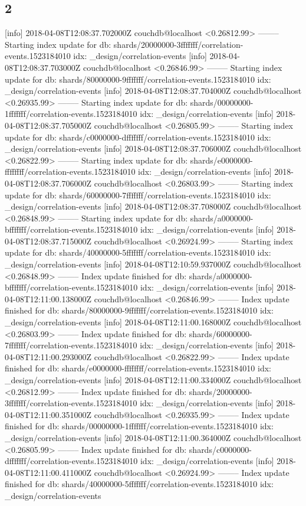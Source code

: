 \subsection{2}
[info] 2018-04-08T12:08:37.702000Z couchdb@localhost <0.26812.99> -------- Starting index update for db: shards/20000000-3fffffff/correlation-events.1523184010 idx: _design/correlation-events
[info] 2018-04-08T12:08:37.703000Z couchdb@localhost <0.26846.99> -------- Starting index update for db: shards/80000000-9fffffff/correlation-events.1523184010 idx: _design/correlation-events
[info] 2018-04-08T12:08:37.704000Z couchdb@localhost <0.26935.99> -------- Starting index update for db: shards/00000000-1fffffff/correlation-events.1523184010 idx: _design/correlation-events
[info] 2018-04-08T12:08:37.705000Z couchdb@localhost <0.26805.99> -------- Starting index update for db: shards/c0000000-dfffffff/correlation-events.1523184010 idx: _design/correlation-events
[info] 2018-04-08T12:08:37.706000Z couchdb@localhost <0.26822.99> -------- Starting index update for db: shards/e0000000-ffffffff/correlation-events.1523184010 idx: _design/correlation-events
[info] 2018-04-08T12:08:37.706000Z couchdb@localhost <0.26803.99> -------- Starting index update for db: shards/60000000-7fffffff/correlation-events.1523184010 idx: _design/correlation-events
[info] 2018-04-08T12:08:37.708000Z couchdb@localhost <0.26848.99> -------- Starting index update for db: shards/a0000000-bfffffff/correlation-events.1523184010 idx: _design/correlation-events
[info] 2018-04-08T12:08:37.715000Z couchdb@localhost <0.26924.99> -------- Starting index update for db: shards/40000000-5fffffff/correlation-events.1523184010 idx: _design/correlation-events
[info] 2018-04-08T12:10:59.937000Z couchdb@localhost <0.26848.99> -------- Index update finished for db: shards/a0000000-bfffffff/correlation-events.1523184010 idx: _design/correlation-events
[info] 2018-04-08T12:11:00.138000Z couchdb@localhost <0.26846.99> -------- Index update finished for db: shards/80000000-9fffffff/correlation-events.1523184010 idx: _design/correlation-events
[info] 2018-04-08T12:11:00.168000Z couchdb@localhost <0.26803.99> -------- Index update finished for db: shards/60000000-7fffffff/correlation-events.1523184010 idx: _design/correlation-events
[info] 2018-04-08T12:11:00.293000Z couchdb@localhost <0.26822.99> -------- Index update finished for db: shards/e0000000-ffffffff/correlation-events.1523184010 idx: _design/correlation-events
[info] 2018-04-08T12:11:00.334000Z couchdb@localhost <0.26812.99> -------- Index update finished for db: shards/20000000-3fffffff/correlation-events.1523184010 idx: _design/correlation-events
[info] 2018-04-08T12:11:00.351000Z couchdb@localhost <0.26935.99> -------- Index update finished for db: shards/00000000-1fffffff/correlation-events.1523184010 idx: _design/correlation-events
[info] 2018-04-08T12:11:00.364000Z couchdb@localhost <0.26805.99> -------- Index update finished for db: shards/c0000000-dfffffff/correlation-events.1523184010 idx: _design/correlation-events
[info] 2018-04-08T12:11:00.411000Z couchdb@localhost <0.26924.99> -------- Index update finished for db: shards/40000000-5fffffff/correlation-events.1523184010 idx: _design/correlation-events


